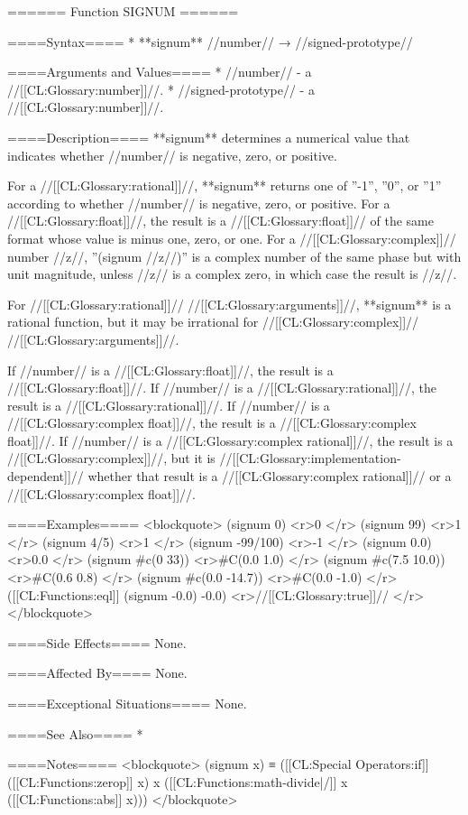====== Function SIGNUM ======

====Syntax====
  * **signum** //number// → //signed-prototype//

====Arguments and Values====
  * //number// - a //[[CL:Glossary:number]]//.
  * //signed-prototype// - a //[[CL:Glossary:number]]//.

====Description====
**signum** determines a numerical value that indicates whether //number// is negative, zero, or positive.

For a //[[CL:Glossary:rational]]//, **signum** returns one of ''-1'', ''0'', or ''1'' according to whether //number// is negative, zero, or positive. For a //[[CL:Glossary:float]]//, the result is a //[[CL:Glossary:float]]// of the same format whose value is minus one, zero, or one. For a //[[CL:Glossary:complex]]// number //z//, ''(signum //z//)'' is a complex number of the same phase but with unit magnitude, unless //z// is a complex zero, in which case the result is //z//.

For //[[CL:Glossary:rational]]// //[[CL:Glossary:arguments]]//, **signum** is a rational function, but it may be irrational for //[[CL:Glossary:complex]]// //[[CL:Glossary:arguments]]//.

If //number// is a //[[CL:Glossary:float]]//, the result is a //[[CL:Glossary:float]]//. If //number// is a //[[CL:Glossary:rational]]//, the result is a //[[CL:Glossary:rational]]//. If //number// is a //[[CL:Glossary:complex float]]//, the result is a //[[CL:Glossary:complex float]]//. If //number// is a //[[CL:Glossary:complex rational]]//, the result is a //[[CL:Glossary:complex]]//, but it is //[[CL:Glossary:implementation-dependent]]// whether that result is a //[[CL:Glossary:complex rational]]// or a //[[CL:Glossary:complex float]]//.

====Examples====
<blockquote> 
(signum 0) <r>0 </r>
(signum 99) <r>1 </r>
(signum 4/5) <r>1 </r>
(signum -99/100) <r>-1 </r>
(signum 0.0) <r>0.0 </r>
(signum #c(0 33)) <r>#C(0.0 1.0) </r>
(signum #c(7.5 10.0)) <r>#C(0.6 0.8) </r>
(signum #c(0.0 -14.7)) <r>#C(0.0 -1.0) </r>
([[CL:Functions:eql]] (signum -0.0) -0.0) <r>//[[CL:Glossary:true]]// </r>
</blockquote>

====Side Effects====
None.

====Affected By====
None.

====Exceptional Situations====
None.

====See Also====
  * {\secref\FloatSubstitutability}

====Notes====
<blockquote> 
(signum x) ≡ ([[CL:Special Operators:if]] ([[CL:Functions:zerop]] x) x ([[CL:Functions:math-divide|/]] x ([[CL:Functions:abs]] x))) 
</blockquote>

